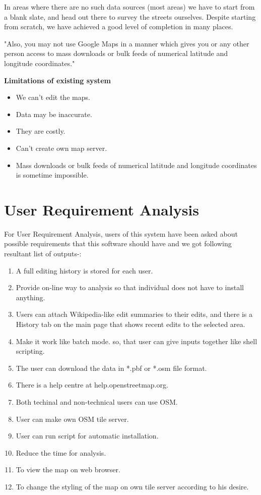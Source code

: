 In areas where there are no such data sources (most areas) we have to start from a blank slate, and head out there to survey the streets ourselves. Despite starting from scratch, we have achieved a good level of completion in many places.  

"Also, you may not use Google Maps in a manner which gives you or any other person access to mass downloads or bulk feeds of numerical latitude and longitude coordinates."

{\bf {Limitations of existing system }}
\begin{itemize}
\item We can't edit the maps.

\item Data may be inaccurate.

\item They are costly.

\item Can't create own map server.

\item Mass downloads or bulk feeds of numerical latitude and longitude coordinates is sometime impossible.
\end{itemize}

\section{User Requirement Analysis}
For User Requirement Analysis, users of this system have been asked about
possible requirements that this software should have and we got following
resultant list of outputs-:
\begin{enumerate}
\item A full editing history is stored for each user.
\item Provide on-line way to analysis so that individual does not have to
install anything.
\item Users can attach Wikipedia-like edit summaries to their edits, and there is a History tab on the main page that shows recent edits to the selected area.
\item Make it work like batch mode. so, that user can give inputs
together like shell scripting.
\item The user can download the data in *.pbf or *.osm file format.
\item There is a help centre at help.openstreetmap.org.
\item Both techinal and non-technical users can use OSM.
\item User can make own OSM tile server.
\item User can run script for automatic installation.
\item Reduce the time for analysis.
\item To view the map on web browser.
\item To change the styling of the map on own tile server according to his desire.

\end{enumerate}



